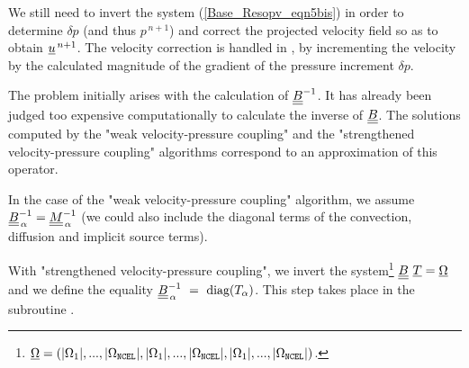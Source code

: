 We still need to invert the system (\ref{Base_Resopv_eqn5bis}) in order to determine $\delta p$ (and thus $p^{\,n+1}$) and correct the projected velocity field so as to obtain $\underline{u}^{\,n+1}$. The velocity correction is handled in , by incrementing the velocity by the calculated magnitude of the gradient of the pressure increment $\delta p$.

The problem initially arises with the calculation of $\underline{\underline{B}}^{-1}$. It has already been judged too expensive computationally to calculate the inverse of $\underline{\underline{B}}$. The solutions computed by the "weak velocity-pressure coupling" and the "strengthened velocity-pressure coupling" algorithms correspond to an approximation of this operator.

In the case of the "weak velocity-pressure coupling" algorithm, we assume $\underline{\underline{B}}_{\,\alpha}^{-1} = \underline{\underline{M}}_{\,\alpha}^{-1}$ (we could also include the diagonal terms of the convection, diffusion and implicit source terms).

With "strengthened velocity-pressure coupling", we invert the system\footnote{$\underline{\Omega} = (|\Omega_1|,...,|\Omega_{\text{\texttt{NCEL}}}|,|\Omega_1|,...,|\Omega_{\text{\texttt{NCEL}}}|,|\Omega_1|,...,|\Omega_{\text{\texttt{NCEL}}}|)$.} $\tens{B}\ \vect{T} = \vect{\Omega} $ and we define the equality $\underline{\underline{B}}_{\,\alpha}^{-1}~=~\text{diag}(T_\alpha) $. This step takes place in the subroutine .

